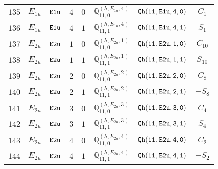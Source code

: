 \documentclass[fleqn,8pt]{jsarticle}
\begin{document}
\begin{table}[ht!]
\begin{center}
\begin{tabular}{cccccccc}
$ 135 $ & $ E_{1u} $ & $ {\tt E1u} $ & $ 4 $ & $ 0 $ & $ \mathbb{Q}_{11,0}^{(h,E_{1u},4)} $ & $ {\tt Qh(11,E1u,4,0)} $ & $ C_{1} $ \\
$ 136 $ & $ E_{1u} $ & $ {\tt E1u} $ & $ 4 $ & $ 1 $ & $ \mathbb{Q}_{11,1}^{(h,E_{1u},4)} $ & $ {\tt Qh(11,E1u,4,1)} $ & $ S_{1} $ \\
$ 137 $ & $ E_{2u} $ & $ {\tt E2u} $ & $ 1 $ & $ 0 $ & $ \mathbb{Q}_{11,0}^{(h,E_{2u},1)} $ & $ {\tt Qh(11,E2u,1,0)} $ & $ C_{10} $ \\
$ 138 $ & $ E_{2u} $ & $ {\tt E2u} $ & $ 1 $ & $ 1 $ & $ \mathbb{Q}_{11,1}^{(h,E_{2u},1)} $ & $ {\tt Qh(11,E2u,1,1)} $ & $ S_{10} $ \\
$ 139 $ & $ E_{2u} $ & $ {\tt E2u} $ & $ 2 $ & $ 0 $ & $ \mathbb{Q}_{11,0}^{(h,E_{2u},2)} $ & $ {\tt Qh(11,E2u,2,0)} $ & $ C_{8} $ \\
$ 140 $ & $ E_{2u} $ & $ {\tt E2u} $ & $ 2 $ & $ 1 $ & $ \mathbb{Q}_{11,1}^{(h,E_{2u},2)} $ & $ {\tt Qh(11,E2u,2,1)} $ & $ - S_{8} $ \\
$ 141 $ & $ E_{2u} $ & $ {\tt E2u} $ & $ 3 $ & $ 0 $ & $ \mathbb{Q}_{11,0}^{(h,E_{2u},3)} $ & $ {\tt Qh(11,E2u,3,0)} $ & $ C_{4} $ \\
$ 142 $ & $ E_{2u} $ & $ {\tt E2u} $ & $ 3 $ & $ 1 $ & $ \mathbb{Q}_{11,1}^{(h,E_{2u},3)} $ & $ {\tt Qh(11,E2u,3,1)} $ & $ S_{4} $ \\
$ 143 $ & $ E_{2u} $ & $ {\tt E2u} $ & $ 4 $ & $ 0 $ & $ \mathbb{Q}_{11,0}^{(h,E_{2u},4)} $ & $ {\tt Qh(11,E2u,4,0)} $ & $ C_{2} $ \\
$ 144 $ & $ E_{2u} $ & $ {\tt E2u} $ & $ 4 $ & $ 1 $ & $ \mathbb{Q}_{11,1}^{(h,E_{2u},4)} $ & $ {\tt Qh(11,E2u,4,1)} $ & $ - S_{2} $ \\
 \hline \hline
\end{tabular}
\end{center}
\end{table}
\end{document}
